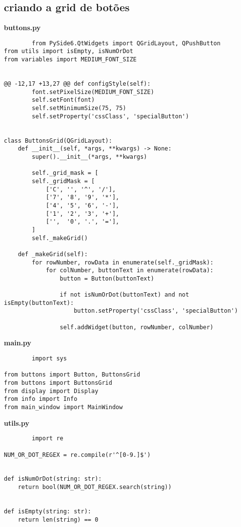 \documentclass[12pt,a4paper]{article}
\begin{document}
    \subsection{ criando a grid de botões}
    \textbf{buttons.py}
    \begin{lstlisting}
        from PySide6.QtWidgets import QGridLayout, QPushButton
from utils import isEmpty, isNumOrDot
from variables import MEDIUM_FONT_SIZE


@@ -12,17 +13,27 @@ def configStyle(self):
        font.setPixelSize(MEDIUM_FONT_SIZE)
        self.setFont(font)
        self.setMinimumSize(75, 75)
        self.setProperty('cssClass', 'specialButton')


class ButtonsGrid(QGridLayout):
    def __init__(self, *args, **kwargs) -> None:
        super().__init__(*args, **kwargs)

        self._grid_mask = [
        self._gridMask = [
            ['C', '', '^', '/'],
            ['7', '8', '9', '*'],
            ['4', '5', '6', '-'],
            ['1', '2', '3', '+'],
            ['',  '0', '.', '='],
        ]
        self._makeGrid()

    def _makeGrid(self):
        for rowNumber, rowData in enumerate(self._gridMask):
            for colNumber, buttonText in enumerate(rowData):
                button = Button(buttonText)

                if not isNumOrDot(buttonText) and not isEmpty(buttonText):
                    button.setProperty('cssClass', 'specialButton')

                self.addWidget(button, rowNumber, colNumber)
    \end{lstlisting}
    \textbf{main.py}
    \begin{lstlisting}
        import sys

from buttons import Button, ButtonsGrid
from buttons import ButtonsGrid
from display import Display
from info import Info
from main_window import MainWindow
    \end{lstlisting}
    \textbf{utils.py}
    \begin{lstlisting}
        import re

NUM_OR_DOT_REGEX = re.compile(r'^[0-9.]$')


def isNumOrDot(string: str):
    return bool(NUM_OR_DOT_REGEX.search(string))


def isEmpty(string: str):
    return len(string) == 0
    \end{lstlisting}
\end{document}
